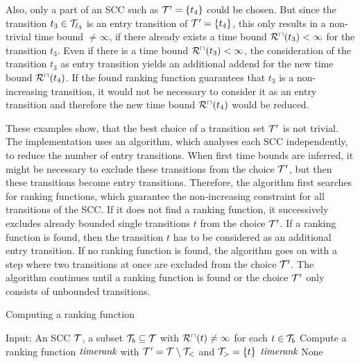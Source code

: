 Also, only a part of an SCC such as $\mathcal{T}' = \lbrace t_4 \rbrace$ could be chosen.
But since the transition $t_3 \in \mathcal{T}_{\ell_3}$ is an entry transition of $\mathcal{T}' = \lbrace t_4 \rbrace$, this only results in a non-trivial time bound $\neq \infty$, if there already exists a time bound ${\mathcal{R}^\sqcap}(t_3) < \infty$ for the transition $t_3$.
Even if there is a time bound ${\mathcal{R}^\sqcap}(t_3) < \infty$, the consideration of the transition $t_3$ as entry transition yields an additional addend for the new time bound ${\mathcal{R}^\sqcap}(t_4)$.
If the found ranking function guarantees that $t_3$ is a non-increasing transition, it would not be necessary to consider it as an entry transition and therefore the new time bound ${\mathcal{R}^\sqcap}(t_4)$ would be reduced.

These examples show, that the best choice of a transition set $\mathcal{T}'$ is not trivial.
The implementation uses an algorithm, which analyses each SCC independently, to reduce the number of entry transitions.
When first time bounds are inferred, it might be necessary to exclude these transitions from the choice $\mathcal{T}'$, but then these transitions become entry transitions.
Therefore, the algorithm first searches for ranking functions, which guarantee the non-increasing constraint for all transitions of the SCC.
If it does not find a ranking function, it successively excludes already bounded single transitions $t$ from the choice $\mathcal{T}'$.
If a ranking function is found, then the transition $t$ has to be considered as an additional entry transition.
If no ranking function is found, the algorithm goes on with a step where two transitions at once are excluded from the choice $\mathcal{T}'$.
The algorithm continues until a ranking function is found or the choice $\mathcal{T}'$ only consists of unbounded transitions.

\begin{algorithm}
\caption{Computing a ranking function}\label{ranking_function_algorithm}
\begin{algorithmic}[1]
  \State Input: An SCC $\mathcal{T}$, a subset $\mathcal{T}_b \subseteq \mathcal{T}$ with ${\mathcal{R}^\sqcap}(t) \neq \infty$ for each $t \in \mathcal{T}_b$
        \State Compute a ranking function $\emph{timerank}$ with $\mathcal{T}' = \mathcal{T} \setminus \mathcal{T}_<$ and $\mathcal{T}_> = \lbrace t \rbrace$
          \Return $\emph{timerank}$
        \EndIf
      \EndFor
    \EndFor
  \EndFor
  \Return None
\end{algorithmic}
\end{algorithm}
